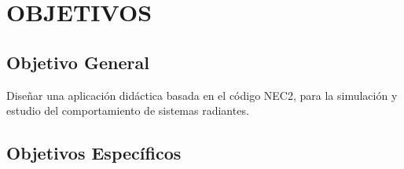


\section{OBJETIVOS}


\subsection{Objetivo General}
Diseñar una aplicación didáctica basada en el código NEC2, para la simulación y estudio del comportamiento de sistemas radiantes.

\subsection{Objetivos Específicos}

